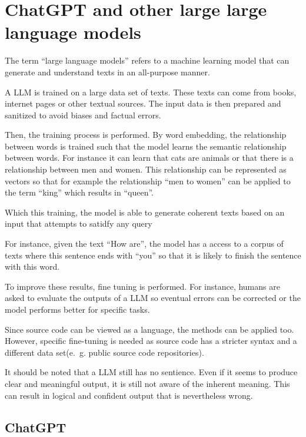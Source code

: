 \section{ChatGPT and other large large language models}

The term \enquote{large language models} refers to a machine learning model that can generate and understand texts in an all-purpose manner. 

A \ac{LLM} is trained on a large data set of texts. These texts can come from books, internet pages or other textual sources. The input data is then prepared and sanitized to avoid biases and factual errors.


Then, the training process is performed. By word embedding, the relationship between words is trained such that the model learns the semantic relationship between words. For instance it can learn that cats are animals  or that there is a relationship between men and women. This relationship can be represented as vectors so that for example the relationship \enquote{men to women} can be applied to the term \enquote{king} which results in \enquote{queen}.

Which this training, the model is able to generate coherent texts based on an input that attempts to satidfy any query


For instance, given the text \enquote{How are}, the model  has a access to a corpus of texts where this sentence ends with \enquote{you} so that it is likely to finish the sentence with this word. 

To improve these results, fine tuning is performed. For instance, humans are asked to evaluate the outputs of a \ac{LLM} so eventual errors can be corrected or the model performs better for specific tasks.



Since source code can be viewed as a language, the methods can be applied too. However, specific fine-tuning is needed as source code  has a stricter syntax and a different data set(e.~g. public source code repositories).

It should be noted that a \ac{LLM} still has no sentience. Even if it seems to produce clear and meaningful output, it is still not aware of the inherent meaning. This can result in logical and confident output that is nevertheless wrong. \cite{Amaratunga2023}

\subsection{ChatGPT}
\label{sec:chatgpt}


